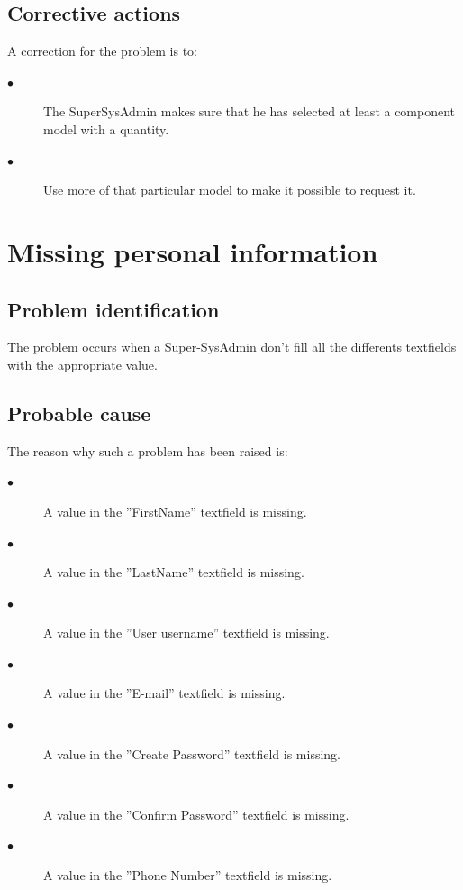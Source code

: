 \subsection{Corrective actions}

A correction for the problem is to:\\
\begin{description}
\item[$\bullet$] The SuperSysAdmin makes sure that he has selected at least a
component model with a quantity.
\item[$\bullet$] Use more of that particular model to make it possible to
request it.
\end{description}







\section{Missing personal information} 

\subsection{Problem identification}
The problem occurs when a Super-SysAdmin don't fill all the differents
textfields with the appropriate value.
\subsection{Probable cause}

The reason why such a problem has been raised is:\\
\begin{description}
\item[$\bullet$] A value in the ''FirstName'' textfield is missing.
\item[$\bullet$] A value in the ''LastName'' textfield is missing.
\item[$\bullet$] A value in the ''User username'' textfield is missing.
\item[$\bullet$] A value in the ''E-mail'' textfield is missing.
\item[$\bullet$] A value in the ''Create Password'' textfield is missing.
\item[$\bullet$] A value in the ''Confirm Password'' textfield is missing.
\item[$\bullet$] A value in the ''Phone Number'' textfield is missing.

\end{description}


